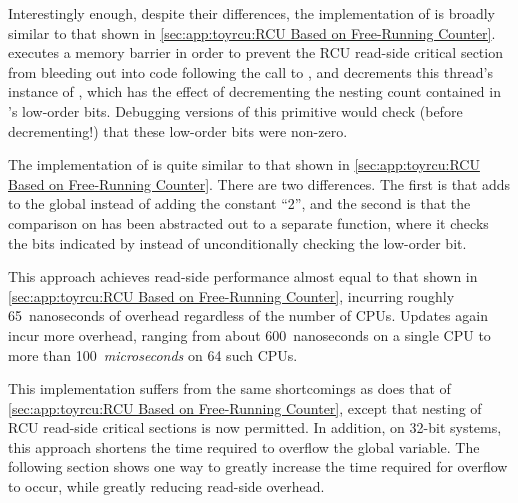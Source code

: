 \begin{fcvref}
Interestingly enough, despite their  differences,
the implementation of 
is broadly similar to that shown in
\cref{sec:app:toyrcu:RCU Based on Free-Running Counter}.
 executes a memory barrier
in order to prevent the RCU read-side
critical section from bleeding out into code following the call
to , and
 decrements this thread's instance of ,
which has the effect of decrementing the nesting count contained in
's low-order bits.
Debugging versions of this primitive would check (before decrementing!\@)
that these low-order bits were non-zero.
\end{fcvref}

\begin{fcvref}
The implementation of  is quite similar to
that shown in
\cref{sec:app:toyrcu:RCU Based on Free-Running Counter}.
There are two differences.
The first is that 
adds  to the global 
instead of adding the constant ``2'',
and the second is that the comparison on 
has been abstracted out to a separate function,
where it checks the bits indicated by 
instead of unconditionally checking the low-order bit.
\end{fcvref}

This approach achieves read-side performance almost equal to that
shown in
\cref{sec:app:toyrcu:RCU Based on Free-Running Counter}, incurring
roughly 65~nanoseconds of overhead regardless of the number of
 CPUs.
Updates again incur more overhead, ranging from about 600~nanoseconds on
a single  CPU to more than 100~\emph{microseconds} on 64
such CPUs.

\QuickQuizEnd

This implementation suffers from the same shortcomings as does that of
\cref{sec:app:toyrcu:RCU Based on Free-Running Counter}, except that
nesting of RCU read-side critical sections is now permitted.
In addition, on 32-bit systems, this approach shortens the time
required to overflow the global  variable.
The following section shows one way to greatly increase the time
required for overflow to occur, while greatly reducing read-side
overhead.

